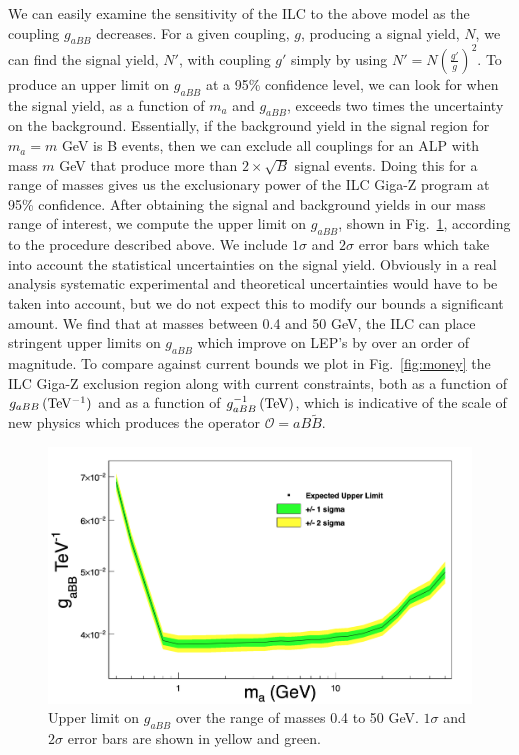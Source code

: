 \documentclass[aps,onecolumn,twoside,secnumarabic,12pt,balancelastpage,amsmath,amssymb,nofootinbib,hyperref=pdftex]{revtex4}
\begin{document}
We can easily examine the sensitivity of the ILC to the above model as the coupling $g_{a BB}$ decreases. For a given coupling, $g$, producing a signal yield, $N$, we can find the signal yield, $N'$, with coupling $g'$ simply by using $N' = N(\frac{g'}{g})^{2}$. To produce an upper limit on $g_{aBB}$ at a 95\% confidence level, we can look for when the signal yield, as a function of $m_{a}$ and $g_{a BB}$, exceeds two times the uncertainty on the background. Essentially, if the background yield in the signal region for $m_{a} = m$ GeV is B events, then we can exclude all couplings for an ALP with mass $m$ GeV that produce more than $2\times\sqrt{B}$ signal events. Doing this for a range of masses gives us the exclusionary power of the ILC Giga-Z program at 95\% confidence.
\vskip 0.12in
After obtaining the signal and background yields in our mass range of interest, we compute the upper limit on $g_{aBB}$, shown in Fig.~\ref{fig:1d_exclusion}, according to the procedure described above. We include $1\sigma$ and $2\sigma$ error bars which take into account the statistical uncertainties on the signal yield. Obviously in a real analysis systematic experimental and theoretical uncertainties would have to be taken into account, but we do not expect this to modify our bounds a significant amount. We find that at masses between 0.4 and 50 GeV, the ILC can place stringent upper limits on $g_{aBB}$ which improve on LEP's by over an order of magnitude. To compare against current bounds we plot in Fig.~\ref{fig:money} the ILC Giga-Z exclusion region along with current constraints, both as a function of $g_{aBB}\,\rm{(TeV^{-1})}$ and as a function of $g_{aBB}^{-1}\,\rm{(TeV)}$, which is indicative of the scale of new physics which produces the operator $\mathcal{O} = aB\tilde{B}$.
\begin{figure}[t]
\begin{center}
\includegraphics[width=14cm]{Expected_limit2.png}
\caption{Upper limit on $g_{aBB}$ over the range of masses 0.4 to 50 GeV. $1\sigma$ and $2\sigma$ error bars are shown in yellow and green.}
\label{fig:1d_exclusion}
\end{center}
\end{figure}
\end{document}
